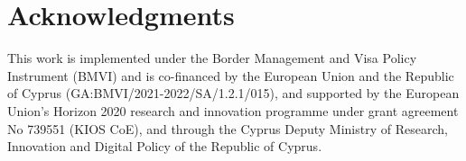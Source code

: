 \section*{Acknowledgments}
This work is implemented under the Border Management and Visa Policy Instrument (BMVI) and is co-financed by the European Union and the Republic of Cyprus (GA:BMVI/2021-2022/SA/1.2.1/015), and supported by the European Union's Horizon 2020 research and innovation programme under grant agreement No 739551 (KIOS CoE), and through the Cyprus Deputy Ministry of Research, Innovation and Digital Policy of the Republic of Cyprus.